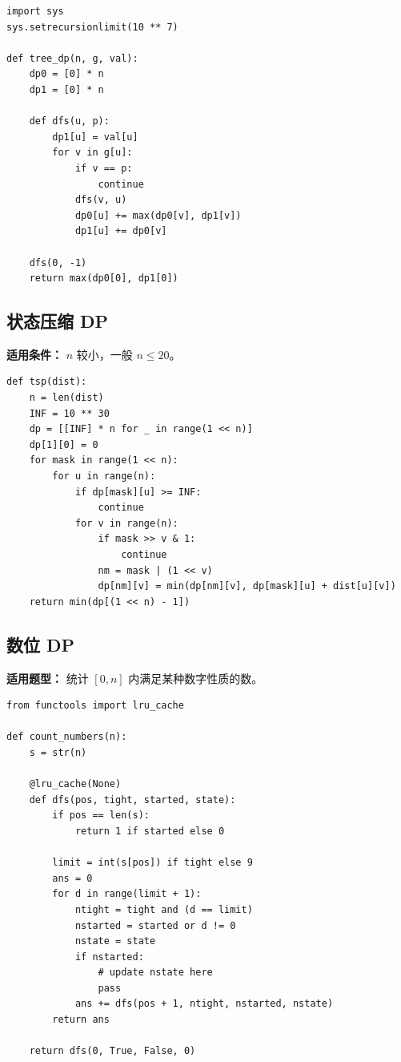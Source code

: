 \documentclass[UTF8,a4paper,14pt]{ctexart}
\begin{document}
\begin{lstlisting}
import sys
sys.setrecursionlimit(10 ** 7)

def tree_dp(n, g, val):
    dp0 = [0] * n
    dp1 = [0] * n

    def dfs(u, p):
        dp1[u] = val[u]
        for v in g[u]:
            if v == p:
                continue
            dfs(v, u)
            dp0[u] += max(dp0[v], dp1[v])
            dp1[u] += dp0[v]

    dfs(0, -1)
    return max(dp0[0], dp1[0])
\end{lstlisting}

\subsection{状态压缩 DP}

\textbf{适用条件：}
$n$ 较小，一般 $n \le 20$。

\begin{lstlisting}
def tsp(dist):
    n = len(dist)
    INF = 10 ** 30
    dp = [[INF] * n for _ in range(1 << n)]
    dp[1][0] = 0
    for mask in range(1 << n):
        for u in range(n):
            if dp[mask][u] >= INF:
                continue
            for v in range(n):
                if mask >> v & 1:
                    continue
                nm = mask | (1 << v)
                dp[nm][v] = min(dp[nm][v], dp[mask][u] + dist[u][v])
    return min(dp[(1 << n) - 1])
\end{lstlisting}

\subsection{数位 DP}

\textbf{适用题型：}
统计 $[0,n]$ 内满足某种数字性质的数。

\begin{lstlisting}
from functools import lru_cache

def count_numbers(n):
    s = str(n)

    @lru_cache(None)
    def dfs(pos, tight, started, state):
        if pos == len(s):
            return 1 if started else 0

        limit = int(s[pos]) if tight else 9
        ans = 0
        for d in range(limit + 1):
            ntight = tight and (d == limit)
            nstarted = started or d != 0
            nstate = state
            if nstarted:
                # update nstate here
                pass
            ans += dfs(pos + 1, ntight, nstarted, nstate)
        return ans

    return dfs(0, True, False, 0)
\end{lstlisting}
\end{document}
